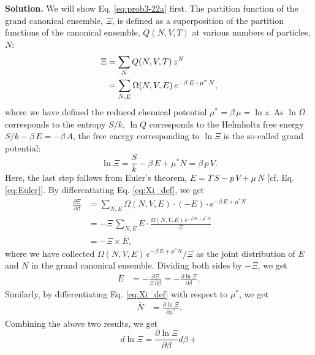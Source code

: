 \documentclass[twocolumn, 10pt]{article}
\numberwithin{equation}{section}
\newenvironment{solution}
{\par\medskip
  \textbf{Solution. }\ignorespaces}
{\medskip}
\begin{document}
\begin{solution}
We will show Eq. \eqref{eq:prob3-22a} first.
The partition function of the grand canonical ensemble, $\Xi$,
is defined as a superposition of
the partition functions of the canonical ensemble, $Q(N, V, T)$
at various numbers of particles, $N$:
%
\begin{align}
\Xi
  &=
  \sum_{N} Q(N, V, T) \, z^N
  \notag \\
  &=
  \sum_{N, E} \Omega(N, V, E) \, e^{-\beta \, E + \mu^* \, N}
,
  \label{eq:Xi_def}
\end{align}
%
where we have defined the reduced chemical potential $\mu^* = \beta \, \mu = \ln z$.
%
As $\ln \Omega$ corresponds to the entropy $S/k$,
$\ln Q$ corresponds to the Helmholtz free energy $S/k - \beta \, E = -\beta \, A$,
the free energy corresponding to $\ln \Xi$
is the so-called grand potential:
%
\begin{equation}
  \ln \Xi
  = \frac{S}{k} - \beta \, E + \mu^* N
  = \beta \, p \, V
  .
  \label{eq:lnXi}
\end{equation}
Here, the last step follows from Euler's theorem,
$E = T \, S - p \, V + \mu \, N$ [cf. Eq. \eqref{eq:Euler}].
%
By differentiating Eq. \eqref{eq:Xi_def}, we get
%
\begin{align*}
  \frac{ \partial \Xi } { \partial \beta }
  &=
  \sum_{N, E} \Omega(N, V, E) \cdot (-E) \cdot e^{-\beta \, E + \mu^* N}
  \\
  &=
  -\Xi \,
  \sum_{N, E} E \cdot \frac{ \Omega(N, V, E) \, e^{-\beta \, E + \mu^* N} } { \Xi }
  \\
  &=
  -\Xi \times \overline{E}
  ,
\end{align*}
%
where we have collected
$\Omega(N, V, E) \, e^{-\beta \, E + \mu^* N}/\Xi$
as the joint distribution of $E$ and $N$
in the grand canonical ensemble.
%
Dividing both sides by $-\Xi$,
we get
\begin{align}
  \overline E
  &=
  -\frac{ \partial \Xi } { \Xi \, \partial \beta }
  =
  -\frac{ \partial \ln \Xi } { \partial \beta }
  ,
  \label{eq:dXidbeta}
\end{align}
Similarly, by differentiating Eq. \eqref{eq:Xi_def}
with respect to $\mu^*$, we get
\begin{align}
  \overline N &= \frac{ \partial \ln \Xi } { \partial \mu^* }
  .
  \label{eq:dXidmu}
\end{align}
%
Combining the above two results, we get
\begin{equation}
  d \ln \Xi
  =
  \frac{ \partial \ln \Xi } { \partial \beta } d\beta
  +

\end{equation}
\end{solution}
\end{document}
